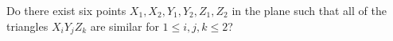 Do there exist six points $X_1,X_2,Y_1, Y_2,Z_1,Z_2$ in the plane such that all of the triangles $X_iY_jZ_k$ are similar for $1\leq i, j, k \leq 2$?